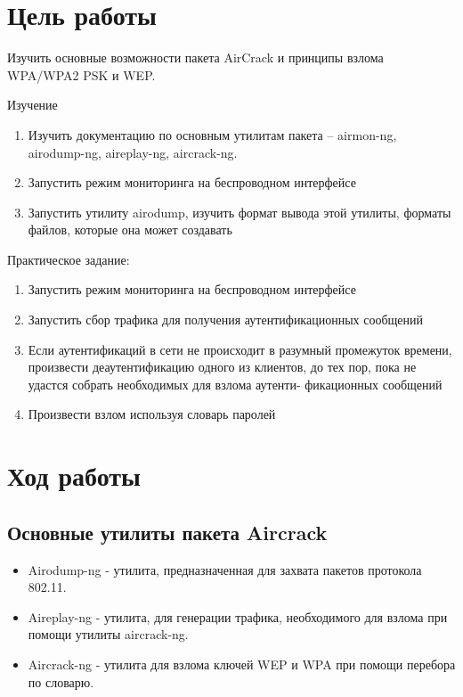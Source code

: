 \section{Цель работы}

Изучить основные возможности пакета AirCrack и принципы взлома WPA/WPA2
PSK и WEP.

Изучение
\begin{enumerate}
	\item Изучить документацию по основным утилитам пакета – airmon-ng, airodump-ng, aireplay-ng, aircrack-ng.
	\item Запустить режим мониторинга на беспроводном интерфейсе
	\item Запустить утилиту airodump, изучить формат вывода этой утилиты, форматы файлов, которые она может создавать
\end{enumerate}

Практическое задание:
\begin{enumerate}
	\item Запустить режим мониторинга на беспроводном интерфейсе
	\item Запустить сбор трафика для получения аутентификационных сообщений
	\item Если аутентификаций в сети не происходит в разумный промежуток времени, произвести деаутентификацию одного из клиентов, до тех пор, пока не удастся собрать необходимых для взлома аутенти-
	фикационных сообщений
	\item Произвести взлом используя словарь паролей
\end{enumerate}

\section{Ход работы}

\subsection{Основные утилиты пакета Aircrack}
\begin{itemize}
	\item Airodump-ng - утилита, предназначенная для захвата пакетов протокола 802.11.
	\item Aireplay-ng - утилита, для генерации трафика, необходимого для взлома при помощи утилиты aircrack-ng.
	\item Aircrack-ng - утилита для взлома ключей WEP и WPA при помощи перебора по словарю.
\end{itemize}
